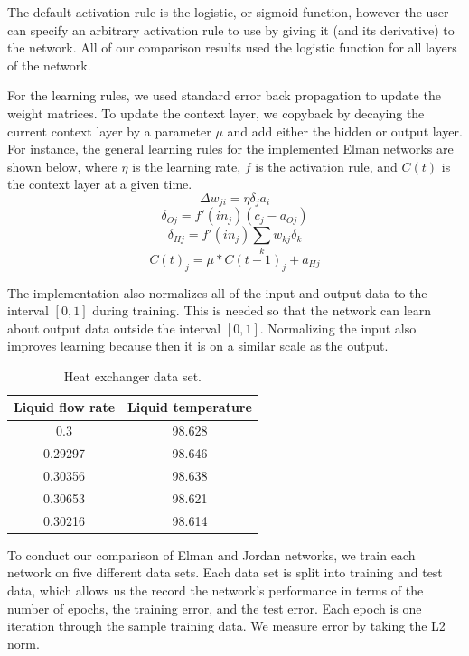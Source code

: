 \documentclass{acm_proc_article-sp}
\begin{document}
The default activation rule is the logistic, or sigmoid function, however the user can specify an arbitrary activation rule to use by giving it (and its derivative) to the network. 
All of our comparison results used the logistic function for all layers of the network. 

For the learning rules, we used standard error back propagation to update the weight matrices. To update the context layer, we copyback by decaying the current context layer by a parameter $\mu$ and add either the hidden or output layer. For instance, the general learning rules for the implemented Elman networks are shown below, where $\eta$ is the learning rate, $f$ is the activation rule, and $C(t)$ is the context layer at a given time.
$$\Delta w_{ji} = \eta \delta_j a_i$$
$$\delta_{Oj} = f'(in_j)(c_{j}-a_{Oj})$$
$$\delta_{Hj} = f'(in_j) \sum_k w_{kj} \delta_k$$
$$C(t)_{j} = \mu * C(t-1)_j + a_{Hj}$$

The implementation also normalizes all of the input and output data to the interval $[0,1]$ during training. 
This is needed so that the network can learn about output data outside the interval $[0,1]$. 
Normalizing the input also improves learning because then it is on a similar scale as the output. 

\begin{table}
\begin{center}
  \begin{tabular}{| c | c |}
  \hline
  \textbf{Liquid flow rate} & \textbf{Liquid temperature}\\ \hline
  0.3 & 98.628\\ \hline
  0.29297 & 98.646\\ \hline
  0.30356 & 98.638\\ \hline
  0.30653 & 98.621\\ \hline
  0.30216 & 98.614\\ \hline
  \end{tabular}
\end{center}  
  \caption{Heat exchanger data set.}
  \label{table:exchange}
\end{table}

To conduct our comparison of Elman and Jordan networks, we train each network on five different data sets. Each data set is split into training and test data, which allows us the record the network's performance in terms of the number of epochs, the training error, and the test error. Each epoch is one iteration through the sample training data. We measure error by taking the L2 norm.
\end{document}
